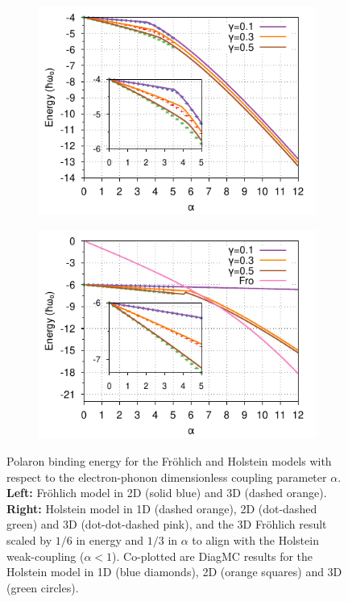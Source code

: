 \begin{figure}
\begin{subfigure}[b]{0.49\textwidth}
    \includegraphics[width=\textwidth]{figures/holstein-2d-alpha-energy-adiabaticity-diagmc-COLOUR.pdf}
  \end{subfigure}
  \begin{subfigure}[b]{0.49\textwidth}
    \includegraphics[width=\textwidth]{figures/holstein-3d-alpha-energy-adiabaticity-diagmc-COLOUR.pdf}
  \end{subfigure}
  \caption{Polaron binding energy for the Fr\"ohlich and Holstein models with respect to the electron-phonon dimensionless coupling parameter $\alpha$. \textbf{Left:} Fr\"ohlich model in 2D (solid blue) and 3D (dashed orange). \textbf{Right:} Holstein model in 1D (dashed orange), 2D (dot-dashed green) and 3D (dot-dot-dashed pink), and the 3D Fr\"ohlich result scaled by $1/6$ in energy and $1/3$ in $\alpha$ to align with the Holstein weak-coupling ($\alpha < 1$). Co-plotted are DiagMC results for the Holstein model in 1D (blue diamonds), 2D (orange squares) and 3D (green circles).}
  \label{fig:energy_alpha}
\end{figure}

